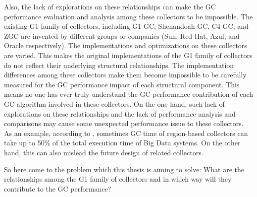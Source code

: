 Also, the lack of explorations on these relationships can make the GC performance evaluation
and analysis among these collectors to be impossible.
The existing G1 family of collectors, including
G1 GC, Shenandoah GC, C4 GC, and ZGC are invented by different groups or companies (Sun, Red Hat, Azul, and Oracle respectively).
The implementations and optimizations on these collectors are varied.
This makes the original implementations of the G1 family of collectors do not reflect
their underlying structural relationships.
The implementation differences among these collectors make them become impossible
to be carefully measured for the GC performance impact of each structural component.
This means no one has ever truly understand the GC performance contribution of each
GC algorithm involved in these collectors.
On the one hand, such lack of explorations on these relationships and the lack of
performance analysis and comparisons may cause some unexpected performance issue to these collectors.
As an example, according to \cite{briandemsky2015speculative}, sometimes GC time of region-based collectors
can take up to 50\% of the total execution time of Big Data systems.
On the other hand, this can also mislead the future design of related collectors.

So here come to the problem which this thesis is aiming to solve: What are the relationships
among the G1 family of collectors and in which way will they contribute to the GC performance?






